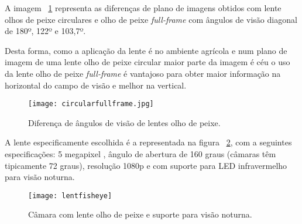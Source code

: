 A imagem ~\ref{fig:circularfullframe} representa as diferenças de plano de imagens obtidos com lente olhos de peixe circulares e olho de peixe \textit{full-frame} com ângulos de visão diagonal de 180º, 122º e 103,7º. 

Desta forma, como a aplicação da lente é no ambiente agrícola e num plano de imagem de uma lente olho de peixe circular maior parte da imagem é céu o uso da lente olho de peixe \textit{full-frame} é vantajoso para obter maior informação na horizontal do campo de visão e melhor na vertical.  

\begin{figure}[h!] %
	\begin{center}
		\leavevmode		
		\texttt{[image: circularfullframe.jpg]}
		\caption{Diferença de ângulos de visão de lentes olho de peixe.}
		\label{fig:circularfullframe}
	\end{center}
\end{figure}


A lente especificamente escolhida é a representada na figura ~\ref{fig:lentfisheye}, com a seguintes especificações: 5 megapixel , ângulo de abertura de 160 graus (câmaras têm tipicamente 72 graus), resolução 1080p e com suporte para LED infravermelho para visão noturna.

\begin{figure}[h!]%
	\begin{center}
		\leavevmode		
		\texttt{[image: lentfisheye]}
		\caption{Câmara com lente olho de peixe e suporte para visão noturna.}
		\label{fig:lentfisheye}
	\end{center}
\end{figure}
